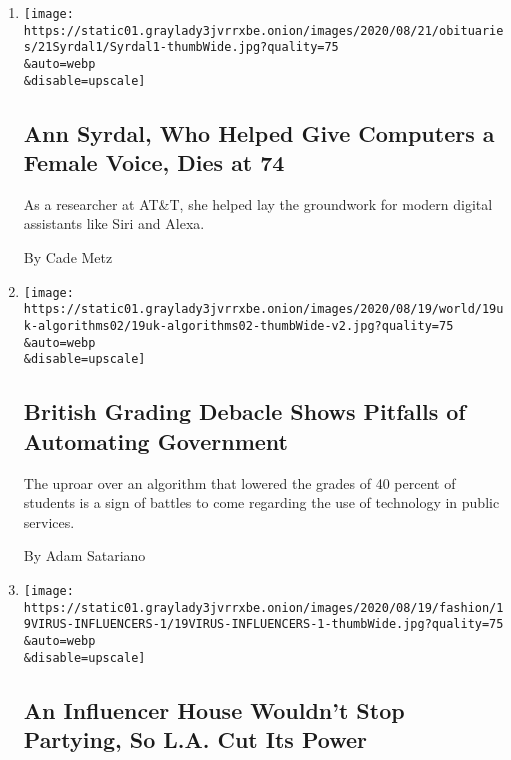 \begin{enumerate}
\def\labelenumi{\arabic{enumi}.}
\item
  \href{/2020/08/20/technology/ann-syrdal-who-helped-give-computers-a-female-voice-dies-at-74.html}{}

  \texttt{[image: https://static01.graylady3jvrrxbe.onion/images/2020/08/21/obituaries/21Syrdal1/Syrdal1-thumbWide.jpg?quality=75\\\&auto=webp\\\&disable=upscale]}

  \hypertarget{ann-syrdal-who-helped-give-computers-a-female-voice-dies-at-74}{%
  \subsection{Ann Syrdal, Who Helped Give Computers a Female Voice, Dies
  at
  74}\label{ann-syrdal-who-helped-give-computers-a-female-voice-dies-at-74}}

  As a researcher at AT\&T, she helped lay the groundwork for modern
  digital assistants like Siri and Alexa.

  By Cade Metz
\item
  \href{/2020/08/20/world/europe/uk-england-grading-algorithm.html}{}

  \texttt{[image: https://static01.graylady3jvrrxbe.onion/images/2020/08/19/world/19uk-algorithms02/19uk-algorithms02-thumbWide-v2.jpg?quality=75\\\&auto=webp\\\&disable=upscale]}

  \hypertarget{british-grading-debacle-shows-pitfalls-of-automating-government}{%
  \subsection{British Grading Debacle Shows Pitfalls of Automating
  Government}\label{british-grading-debacle-shows-pitfalls-of-automating-government}}

  The uproar over an algorithm that lowered the grades of 40 percent of
  students is a sign of battles to come regarding the use of technology
  in public services.

  By Adam Satariano
\item
  \href{/2020/08/19/style/la-party-power-cut-tiktok.html}{}

  \texttt{[image: https://static01.graylady3jvrrxbe.onion/images/2020/08/19/fashion/19VIRUS-INFLUENCERS-1/19VIRUS-INFLUENCERS-1-thumbWide.jpg?quality=75\\\&auto=webp\\\&disable=upscale]}

  \hypertarget{an-influencer-house-wouldnt-stop-partying-so-la-cut-its-power}{%
  \subsection{An Influencer House Wouldn't Stop Partying, So L.A. Cut
  Its
  Power}\label{an-influencer-house-wouldnt-stop-partying-so-la-cut-its-power}}


\end{enumerate}
